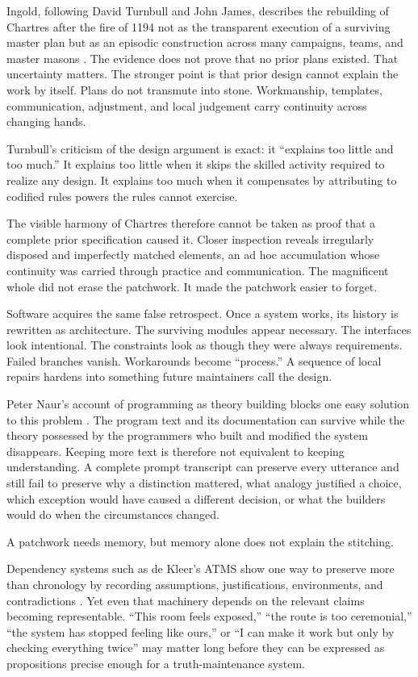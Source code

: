\documentclass[11pt]{article}
\begin{document}
Ingold, following David Turnbull and John James, describes the rebuilding of Chartres after the fire of 1194 not as the transparent execution of a surviving master plan but as an episodic construction across many campaigns, teams, and master masons \cite{ingold2013}. The evidence does not prove that no prior plans existed. That uncertainty matters. The stronger point is that prior design cannot explain the work by itself. Plans do not transmute into stone. Workmanship, templates, communication, adjustment, and local judgement carry continuity across changing hands.

Turnbull's criticism of the design argument is exact: it ``explains too little and too much.'' It explains too little when it skips the skilled activity required to realize any design. It explains too much when it compensates by attributing to codified rules powers the rules cannot exercise.

The visible harmony of Chartres therefore cannot be taken as proof that a complete prior specification caused it. Closer inspection reveals irregularly disposed and imperfectly matched elements, an ad hoc accumulation whose continuity was carried through practice and communication. The magnificent whole did not erase the patchwork. It made the patchwork easier to forget.

Software acquires the same false retrospect. Once a system works, its history is rewritten as architecture. The surviving modules appear necessary. The interfaces look intentional. The constraints look as though they were always requirements. Failed branches vanish. Workarounds become ``process.'' A sequence of local repairs hardens into something future maintainers call the design.

Peter Naur's account of programming as theory building blocks one easy solution to this problem \cite{naur1985}. The program text and its documentation can survive while the theory possessed by the programmers who built and modified the system disappears. Keeping more text is therefore not equivalent to keeping understanding. A complete prompt transcript can preserve every utterance and still fail to preserve why a distinction mattered, what analogy justified a choice, which exception would have caused a different decision, or what the builders would do when the circumstances changed.

A patchwork needs memory, but memory alone does not explain the stitching.

Dependency systems such as de Kleer's ATMS show one way to preserve more than chronology by recording assumptions, justifications, environments, and contradictions \cite{dekleer1986}. Yet even that machinery depends on the relevant claims becoming representable. ``This room feels exposed,'' ``the route is too ceremonial,'' ``the system has stopped feeling like ours,'' or ``I can make it work but only by checking everything twice'' may matter long before they can be expressed as propositions precise enough for a truth-maintenance system.
\end{document}
